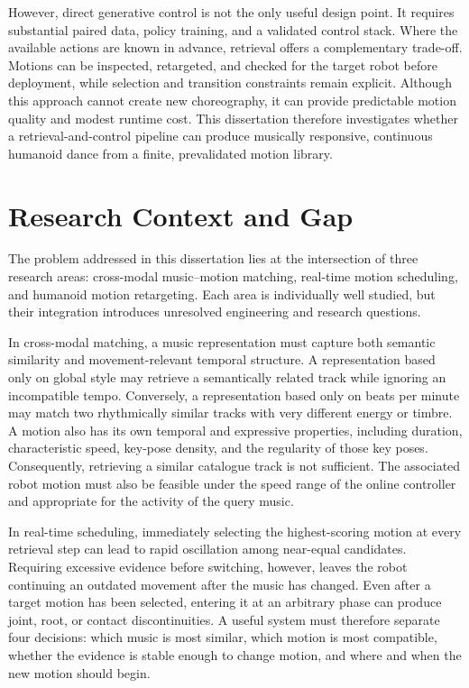 However, direct generative control is not the only useful design point. It
requires substantial paired data, policy training, and a validated control
stack. Where the available actions are known in advance, retrieval offers a
complementary trade-off. Motions can be inspected, retargeted, and checked for
the target robot before deployment, while selection and transition constraints
remain explicit. Although this approach cannot create new choreography, it can
provide predictable motion quality and modest runtime cost. This dissertation
therefore investigates whether a retrieval-and-control pipeline can produce
musically responsive, continuous humanoid dance from a finite, prevalidated
motion library.

\section{Research Context and Gap}
\label{sec:intro_gap}

The problem addressed in this dissertation lies at the intersection of three
research areas: cross-modal music--motion matching, real-time motion
scheduling, and humanoid motion retargeting. Each area is individually well
studied, but their integration introduces unresolved engineering and research
questions.

In cross-modal matching, a music representation must capture both semantic
similarity and movement-relevant temporal structure. A representation based
only on global style may retrieve a semantically related track while ignoring
an incompatible tempo. Conversely, a representation based only on beats per
minute may match two rhythmically similar tracks with very different energy or
timbre. A motion also has its own temporal and expressive properties, including
duration, characteristic speed, key-pose density, and the regularity of those
key poses. Consequently, retrieving a similar catalogue track is not
sufficient. The associated robot motion must also be feasible under the
speed range of the online controller and appropriate for the activity of the
query music.

In real-time scheduling, immediately selecting the highest-scoring motion at
every retrieval step can lead to rapid oscillation among near-equal candidates.
Requiring excessive evidence before switching, however, leaves the robot
continuing an outdated movement after the music has changed. Even
after a target motion has been selected, entering it at an arbitrary phase can
produce joint, root, or contact discontinuities. A useful system must therefore
separate four decisions: which music is most similar, which motion is most
compatible, whether the evidence is stable enough to change motion, and where
and when the new motion should begin.

